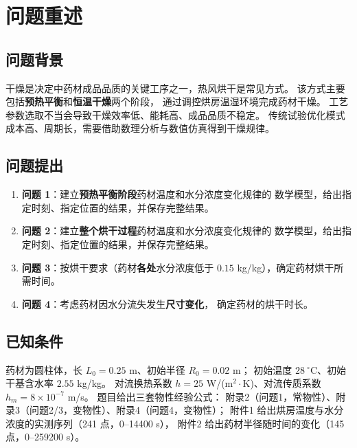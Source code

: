 \section{问题重述}

\subsection{问题背景}

干燥是决定中药材成品品质的关键工序之一，热风烘干是常见方式。
该方式主要包括\textbf{预热平衡}和\textbf{恒温干燥}两个阶段，
通过调控烘房温湿环境完成药材干燥。
工艺参数选取不当会导致干燥效率低、能耗高、成品品质不稳定。
传统试验优化模式成本高、周期长，需要借助数理分析与数值仿真得到干燥规律。

\subsection{问题提出}

\begin{enumerate}[leftmargin=2.2em, itemsep=2pt]
  \item \textbf{问题 1}：建立\textbf{预热平衡阶段}药材温度和水分浓度变化规律的
        数学模型，给出指定时刻、指定位置的结果，并保存完整结果。
  \item \textbf{问题 2}：建立\textbf{整个烘干过程}药材温度和水分浓度变化规律的
        数学模型，给出指定时刻、指定位置的结果，并保存完整结果。
  \item \textbf{问题 3}：按烘干要求（药材\textbf{各处}水分浓度低于
        $0.15$ kg/kg），确定药材烘干所需时间。
  \item \textbf{问题 4}：考虑药材因水分流失发生\textbf{尺寸变化}，
        确定药材的烘干时长。
\end{enumerate}

\subsection{已知条件}

药材为圆柱体，长 $L_0=0.25$ m、初始半径 $R_0=0.02$ m；
初始温度 $28\ ^\circ\mathrm{C}$、初始干基含水率 $2.55$ kg/kg。
对流换热系数 $h=25$ W/(m$^2\cdot$K)、对流传质系数 $h_m=8\times10^{-7}$ m/s。
题目给出三套物性经验公式：
附录2（问题1，常物性）、附录3（问题2/3，变物性）、附录4（问题4，变物性）；
附件1 给出烘房温度与水分浓度的实测序列（241 点，0--14400 s），
附件2 给出药材半径随时间的变化（145 点，0--259200 s）。
